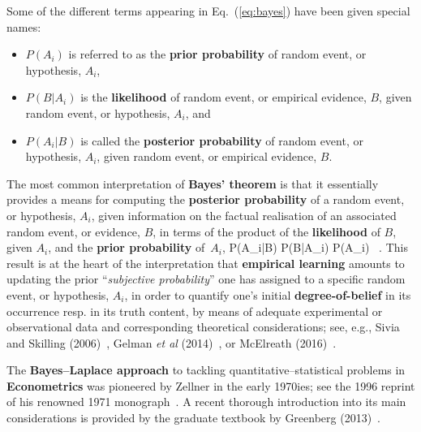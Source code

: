 \medskip
\noindent
Some of the different terms appearing in Eq.~(\ref{eq:bayes}) have 
been given special names:
%
\begin{itemize}
\item $P(A_{i})$ is referred to as the \textbf{prior probability}
of random event, or hypothesis, $A_{i}$,
\item $P(B|A_{i})$ is the \textbf{likelihood} of random event,
or empirical evidence, $B$, given random event, or hypothesis,
$A_{i}$, and
\item $P(A_{i}|B)$ is called the \textbf{posterior probability} of 
random event, or hypothesis, $A_{i}$, given random event,
or empirical evidence, $B$.
\end{itemize}
%

\medskip
\noindent
The most common interpretation of \textbf{Bayes' theorem} is 
that it essentially provides a means for computing the
\textbf{posterior probability} of a random event, or hypothesis,
$A_{i}$, given information on the factual realisation of an
associated random event, or evidence, $B$, in terms of the product
of the \textbf{likelihood} of $B$, given $A_{i}$, and the
\textbf{prior probability} of~$A_{i}$,
%
\be
{}
P(A_{i}|B) \propto P(B|A_{i}) \times P(A_{i}) \ .
\ee
%
This result
is at the heart of the interpretation that \textbf{empirical 
learning} amounts to updating the prior ``\textit{subjective 
probability}'' one has assigned to a specific random 
event, or hypothesis, $A_{i}$, in order to quantify one's initial
\textbf{degree-of-belief} in its occurrence resp. in its truth
content, by means of adequate experimental or observational data
and corresponding theoretical considerations; see, e.g., Sivia and
Skilling (2006)~, Gelman \textit{et al}
(2014)~, or McElreath
(2016)~.

\medskip
\noindent
The \textbf{Bayes--Laplace approach} to tackling 
quantitative--statistical problems in \textbf{Econometrics} was 
pioneered by Zellner in the early 1970ies; see the 1996 reprint of 
his renowned 1971 monograph~. A recent thorough 
introduction into its main considerations is provided by the 
graduate textbook by Greenberg (2013)~.

